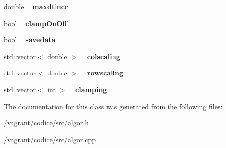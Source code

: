 \begin{DoxyCompactItemize}
\item 
\hypertarget{classAlgor_a5a79a33a1672d4436c944d6084151e03}{double {\bfseries \-\_\-maxdtincr}}\label{classAlgor_a5a79a33a1672d4436c944d6084151e03}

\item 
\hypertarget{classAlgor_a4dc5204e65867fb41c53c70a04b569b4}{bool {\bfseries \-\_\-clamp\-On\-Off}}\label{classAlgor_a4dc5204e65867fb41c53c70a04b569b4}

\item 
\hypertarget{classAlgor_a999bf0e68c9bcec173024ffa4a79446c}{bool {\bfseries \-\_\-savedata}}\label{classAlgor_a999bf0e68c9bcec173024ffa4a79446c}

\item 
\hypertarget{classAlgor_adeee632dfafe6cf6f6fa8cc8af0905c6}{std\-::vector$<$ double $>$ {\bfseries \-\_\-colscaling}}\label{classAlgor_adeee632dfafe6cf6f6fa8cc8af0905c6}

\item 
\hypertarget{classAlgor_abee1c51611c2f670f844b16a92abfcfa}{std\-::vector$<$ double $>$ {\bfseries \-\_\-rowscaling}}\label{classAlgor_abee1c51611c2f670f844b16a92abfcfa}

\item 
\hypertarget{classAlgor_a193f4c0d9f47eb27c0caebd7cc0ab074}{std\-::vector$<$ int $>$ {\bfseries \-\_\-clamping}}\label{classAlgor_a193f4c0d9f47eb27c0caebd7cc0ab074}

\end{DoxyCompactItemize}


The documentation for this class was generated from the following files\-:\begin{DoxyCompactItemize}
\item 
/vagrant/codice/src/\hyperlink{algor_8h}{algor.\-h}\item 
/vagrant/codice/src/\hyperlink{algor_8cpp}{algor.\-cpp}\end{DoxyCompactItemize}
